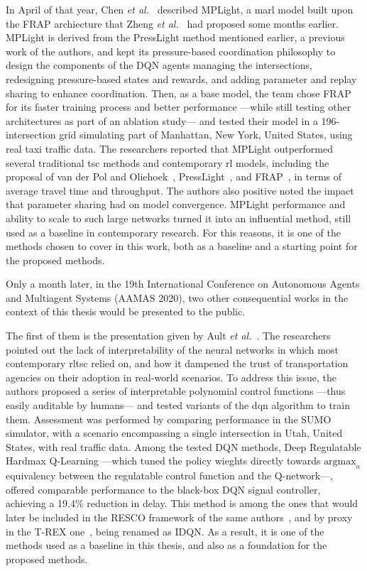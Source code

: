 In April of that year, Chen \textit{et al.}~\cite{Chen2020} described MPLight, a \gls{marl} model built upon the FRAP archiecture that Zheng \textit{et al.}~\cite{Zheng2019} had proposed some months earlier. MPLight is derived from the PressLight method mentioned earlier, a previous work of the authors, and kept its pressure-based coordination philosophy to design the components of the DQN agents managing the intersections, redesigning pressure-based states and rewards, and adding parameter and replay sharing to enhance coordination. Then, as a base model, the team chose FRAP for its faster training process and better performance —while still testing other architectures as part of an ablation study— and tested their model in a 196-intersection grid simulating part of Manhattan, New York, United States, using real taxi traffic data. The researchers reported that MPLight outperformed several traditional \gls{tsc} methods and contemporary \gls{rl} models, including the proposal of van der Pol and Oliehoek~\cite{vanderPol2016}, PressLight~\cite{Wei2019b}, and FRAP~\cite{Zheng2019}, in terms of average travel time and throughput. The authors also positive noted the impact that parameter sharing had on model convergence. MPLight performance and ability to scale to such large networks turned it into an influential method, still used as a baseline in contemporary research. For this reasons, it is one of the methods chosen to cover in this work, both as a baseline and a starting point for the proposed methods.

Only a month later, in the 19th International Conference on Autonomous Agents and Multiagent Systems (AAMAS 2020), two other consequential works in the context of this thesis would be presented to the public.

The first of them is the presentation given by Ault \textit{et al.}~\cite{Ault2020}. The researchers pointed out the lack of interpretability of the neural networks in which most contemporary \gls{rltsc} relied on, and how it dampened the trust of transportation agencies on their adoption in real-world scenarios. To address this issue, the authors proposed a series of interpretable polynomial control functions —thus easily auditable by humans— and tested variants of the \gls{dqn} algorithm to train them. Assessment was performed by comparing performance in the SUMO simulator, with a scenario encompassing a single intersection in Utah, United States, with real traffic data. Among the tested DQN methods, Deep Regulatable Hardmax Q-Learning —which tuned the policy wieghts directly towards $\text{argmax}_a$ equivalency between the regulatable control function and the Q-network—, offered comparable performance to the black-box DQN signal controller, achieving a 19.4\% reduction in delay. This method is among the ones that would later be included in the RESCO framework of the same authors~\cite{Ault2021}, and by proxy in the T-REX one~\cite{Nguyen2025}, being renamed as IDQN. As a result, it is one of the methods used as a baseline in this thesis, and also as a foundation for the proposed methods.

